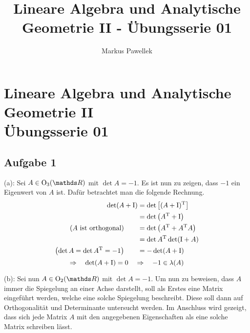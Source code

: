 

\title{Lineare Algebra und Analytische Geometrie II - Übungsserie 01}
\author{Markus Pawellek}

\cfoot{\newline\newline\newline\pagemark/\pageref{LastPage} }


	
	\section*{\centering Lineare Algebra und Analytische Geometrie II \\ Übungsserie 01} %
	\label{sec:lineare_algebra_und_analytische_geometrie_ii}

		\subsection*{Aufgabe 1} %
		\label{sub:aufgabe_1}
		
			(a): Sei $A\in \m{O}_3(\SR)$ mit $\det A = -1$. 
			Es ist nun zu zeigen, dass $-1$ ein Eigenwert von $A$ ist.
			Dafür betrachtet man die folgende Rechnung.
			\begin{alignat*}{3}
				\det(A+\mathrm{I}) &= \det\left[ (A+\mathrm{I})^{\mathrm{T}} \right] \\
					&= \det\left( A^{\mathrm{T}} + \mathrm{I} \right) \\
					\text{($A$ ist orthogonal)}\qquad &= \det\left( A^{\mathrm{T}} + A^{\mathrm{T}}A \right) \\
					&= \det A^{\mathrm{T}} \det(\mathrm{I}+A) \\
					\left( \det A = \det A^{\mathrm{T}} = -1 \right)\qquad &= - \det(A+\mathrm{I}) \\
			\end{alignat*}
			\[
				\Rightarrow \quad \det(A+\mathrm{I}) = 0 \quad \Rightarrow \quad -1\in\lambda(A)
			\]
			\qedbox

			(b): Sei nun $A\in\m{O}_2(\SR)$ mit $\det A = -1$.
			Um nun zu beweisen, dass $A$ immer die Spiegelung an einer Achse darstellt, soll als Erstes eine Matrix eingeführt werden, welche eine solche Spiegelung beschreibt.
			Diese soll dann auf Orthogonalität und Determinante untersucht werden.
			Im Anschluss wird gezeigt, dass sich jede Matrix $A$ mit den angegebenen Eigenschaften als eine solche Matrix schreiben lässt.

